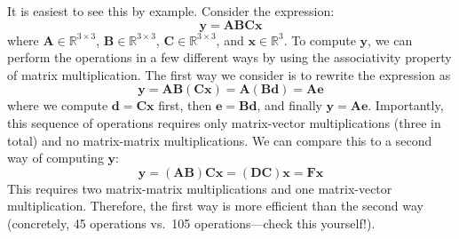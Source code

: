 It is easiest to see this by example. Consider the expression:
\begin{equation*}
    \mathbf{y} = \mathbf{A}\mathbf{B}\mathbf{C}\mathbf{x}
\end{equation*}
where $\mathbf{A} \in \mathbb{R}^{3\times 3}$, $\mathbf{B} \in \mathbb{R}^{3\times 3}$, $\mathbf{C} \in \mathbb{R}^{3\times 3}$, and $\mathbf{x} \in \mathbb{R}^3$. To compute $\mathbf{y}$, we can perform the operations in a few different ways by using the associativity property of matrix multiplication. The first way we consider is to rewrite the expression as
\begin{equation*}
    \mathbf{y} = \mathbf{A}\mathbf{B}(\mathbf{C}\mathbf{x}) = \mathbf{A}(\mathbf{B}\mathbf{d}) = \mathbf{A}\mathbf{e}
\end{equation*}
where we compute $\mathbf{d} = \mathbf{C}\mathbf{x}$ first, then $\mathbf{e} = \mathbf{B}\mathbf{d}$, and finally $\mathbf{y} = \mathbf{A}\mathbf{e}$. Importantly, this sequence of operations requires only matrix-vector multiplications (three in total) and no matrix-matrix multiplications. We can compare this to a second way of computing $\mathbf{y}$:
\begin{equation*}
    \mathbf{y} = (\mathbf{A}\mathbf{B})\mathbf{C}\mathbf{x} = (\mathbf{DC})\mathbf{x} = \mathbf{F}\mathbf{x}
\end{equation*}
This requires two matrix-matrix multiplications and one matrix-vector multiplication. Therefore, the first way is more efficient than the second way (concretely, 45 operations vs.\ 105 operations---check this yourself!).

